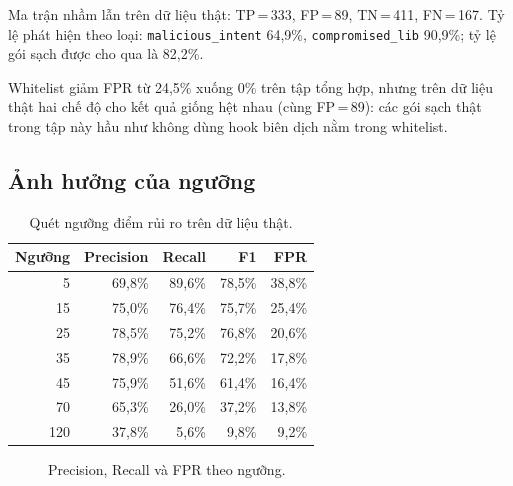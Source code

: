 \documentclass[12pt,a4paper]{article}
\begin{document}
Ma trận nhầm lẫn trên dữ liệu thật: TP\,=\,333, FP\,=\,89, TN\,=\,411, FN\,=\,167. Tỷ lệ phát hiện theo loại: \texttt{malicious\_intent} 64{,}9\%, \texttt{compromised\_lib} 90{,}9\%; tỷ lệ gói sạch được cho qua là 82{,}2\%.

Whitelist giảm FPR từ 24{,}5\% xuống 0\% trên tập tổng hợp, nhưng trên dữ liệu thật hai chế độ cho kết quả giống hệt nhau (cùng FP\,=\,89): các gói sạch thật trong tập này hầu như không dùng hook biên dịch nằm trong whitelist.

\subsection{Ảnh hưởng của ngưỡng}
\begin{table}[H]
\centering
\begin{tabular}{rrrrr}
\toprule
Ngưỡng & Precision & Recall & F1 & FPR \\
\midrule
5   & 69{,}8\% & 89{,}6\% & 78{,}5\% & 38{,}8\% \\
15  & 75{,}0\% & 76{,}4\% & 75{,}7\% & 25{,}4\% \\
25  & 78{,}5\% & 75{,}2\% & 76{,}8\% & 20{,}6\% \\
35  & 78{,}9\% & 66{,}6\% & 72{,}2\% & 17{,}8\% \\
45  & 75{,}9\% & 51{,}6\% & 61{,}4\% & 16{,}4\% \\
70  & 65{,}3\% & 26{,}0\% & 37{,}2\% & 13{,}8\% \\
120 & 37{,}8\% & 5{,}6\%  & 9{,}8\%  & 9{,}2\% \\
\bottomrule
\end{tabular}
\caption{Quét ngưỡng điểm rủi ro trên dữ liệu thật.}
\end{table}

\begin{figure}[H]
\centering
{}
\caption{Precision, Recall và FPR theo ngưỡng.}
\end{figure}
\end{document}
